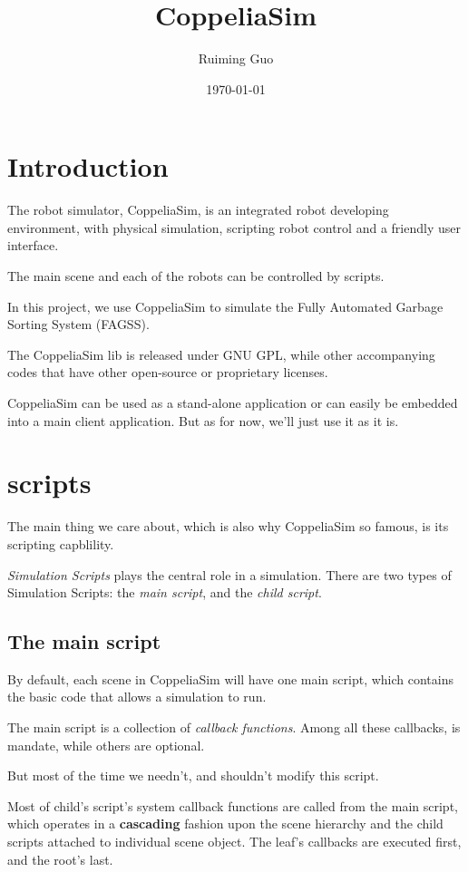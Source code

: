 \documentclass{article}
\title{CoppeliaSim}
\author{Ruiming Guo}
\date{\today}
\begin{document}
\maketitle

\section{Introduction}

The robot simulator, CoppeliaSim, is an integrated robot developing environment, with physical simulation, scripting robot control and a friendly user interface.

The main scene and each of the robots can be controlled by scripts.

In this project, we use CoppeliaSim to simulate the Fully Automated Garbage Sorting System (FAGSS).

The CoppeliaSim lib is released under GNU GPL, while other accompanying codes that have other open-source or proprietary licenses. 

CoppeliaSim can be used as a stand-alone application or can easily be embedded into a main client application. But as for now, we'll just use it as it is.

\section{scripts}

The main thing we care about, which is also why CoppeliaSim so famous, is its scripting capblility. 

\emph{Simulation Scripts} plays the central role in a simulation. There are two types of Simulation Scripts: the \emph{main script}, and the \emph{child script}.

\subsection{The main script}

By default, each scene in CoppeliaSim will have one main script, which contains the basic code that allows a simulation to run.

The main script is a collection of \emph{callback functions}. Among all these callbacks,  is mandate, while others are optional.

But most of the time we needn't, and shouldn't modify this script.

Most of child's script's system callback functions are called from the main script, which operates in a \textbf{cascading} fashion upon the scene hierarchy and the child scripts attached to individual scene object. The leaf's callbacks are executed first, and the root's last.
\end{document}

